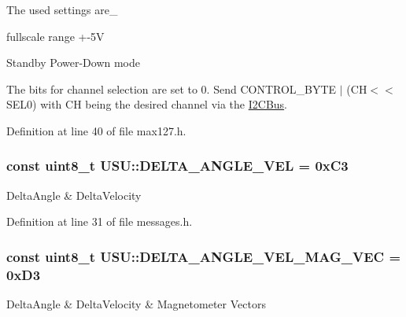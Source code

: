 \-The used settings are\-\_\-
\begin{DoxyItemize}
\item fullscale range +-\/5\-V
\item \-Standby \-Power-\/\-Down mode
\end{DoxyItemize}

\-The bits for channel selection are set to 0. \-Send \-C\-O\-N\-T\-R\-O\-L\-\_\-\-B\-Y\-T\-E $|$ (\-C\-H$<$$<$\-S\-E\-L0) with \-C\-H being the desired channel via the \hyperlink{class_i2_c_bus}{\-I2\-C\-Bus}. 

\-Definition at line 40 of file max127.\-h.

\hypertarget{namespace_u_s_u_acaafc8eff5346d9c529238dd0ceb61a6}{
\subsubsection[{\-D\-E\-L\-T\-A\-\_\-\-A\-N\-G\-L\-E\-\_\-\-V\-E\-L}]{\setlength{\rightskip}{0pt plus 5cm}const uint8\-\_\-t {\bf \-U\-S\-U\-::\-D\-E\-L\-T\-A\-\_\-\-A\-N\-G\-L\-E\-\_\-\-V\-E\-L} = 0x\-C3}}\label{namespace_u_s_u_acaafc8eff5346d9c529238dd0ceb61a6}
\-Delta\-Angle \& \-Delta\-Velocity 

\-Definition at line 31 of file messages.\-h.

\hypertarget{namespace_u_s_u_a18e6e53c69e61c3538c351bb86c77629}{
\subsubsection[{\-D\-E\-L\-T\-A\-\_\-\-A\-N\-G\-L\-E\-\_\-\-V\-E\-L\-\_\-\-M\-A\-G\-\_\-\-V\-E\-C}]{\setlength{\rightskip}{0pt plus 5cm}const uint8\-\_\-t {\bf \-U\-S\-U\-::\-D\-E\-L\-T\-A\-\_\-\-A\-N\-G\-L\-E\-\_\-\-V\-E\-L\-\_\-\-M\-A\-G\-\_\-\-V\-E\-C} = 0x\-D3}}\label{namespace_u_s_u_a18e6e53c69e61c3538c351bb86c77629}
\-Delta\-Angle \& \-Delta\-Velocity \& \-Magnetometer \-Vectors 

